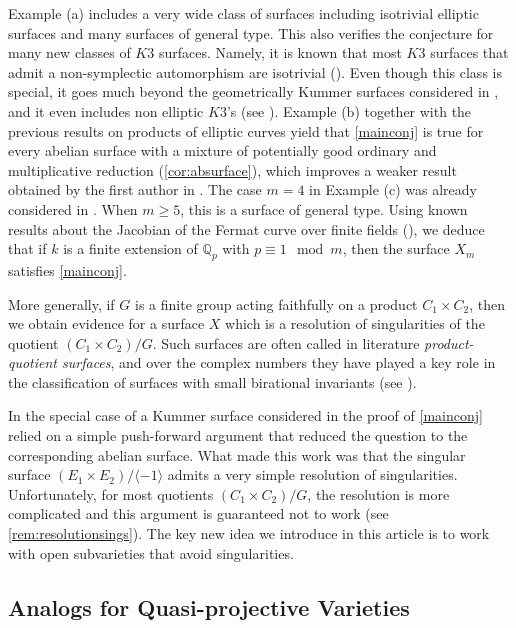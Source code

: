 \documentclass[12pt]{amsart}
\theoremstyle{remark}
\newcommand{\Q}{{\mathbb Q}}
\renewcommand{\1}{{\mathbb{S}}}
\newcommand{\<}{\langle}
\renewcommand{\>}{\rangle}
\begin{document}
Example (a) includes a very wide class of surfaces including isotrivial elliptic surfaces and many surfaces of general type. This also verifies the conjecture for many new classes of $K3$ surfaces. Namely, it is known that most $K3$ surfaces that admit a non-symplectic automorphism are isotrivial (\cite[Theorem 1.1]{GP}). Even though this class is special, it goes much beyond the geometrically Kummer surfaces considered in \cite{GL24}, and it even includes non elliptic $K3$'s (see \cite[Sections 7.2-7.4]{GP}). 
Example (b) together with the previous results on products of elliptic curves yield that \autoref{mainconj} is true for every abelian surface with a mixture of potentially good ordinary and multiplicative reduction (\autoref{cor:absurface}), which improves a weaker result obtained by the first author in \cite[Theorem 1.2]{Gaz19}. The case $m=4$ in Example (c) was already considered in \cite{GL24}. When $m\geq 5$, this is a surface of general type. Using known results about the Jacobian of the Fermat curve over finite fields (\cite{Yui}), we deduce that if $k$ is a finite extension of $\Q_p$ with $p\equiv 1\mod m$, then the surface $X_m$ satisfies \autoref{mainconj}. 



More generally, if $G$ is a finite group acting faithfully on a product $C_1\times C_2$, then we obtain evidence for a surface $X$ which is a resolution of singularities of the quotient $(C_1\times C_2)/G$. Such surfaces are often called in literature \textit{product-quotient surfaces}, and over the complex numbers they have played a key role in the classification of surfaces with small birational invariants (see \cite{CP, MP, P}). 

In the special case of a Kummer surface considered in \cite{GL24} the proof of \autoref{mainconj} relied on a simple push-forward argument that reduced the question to the corresponding abelian surface. What made this work was that the singular surface $(E_1\times E_2)/\langle -1\rangle$ admits a very simple resolution of singularities. Unfortunately,  for most quotients $(C_1\times C_2)/G$, the resolution is more complicated and this argument is guaranteed not to work (see \autoref{rem:resolutionsings}).   The key new idea we introduce in this article is to work with open subvarieties that avoid singularities. 




 
 \subsection*{Analogs for Quasi-projective Varieties}
\end{document}
